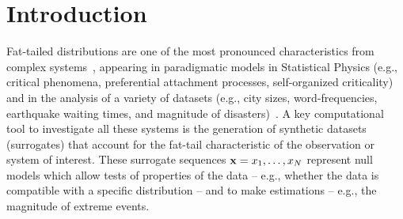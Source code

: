 \documentclass[%
prx,
reprint,
superscriptaddress,
nofootinbib,
 amsmath,amssymb,
 aps,
floatfix,
]{revtex4-2}
\begin{document}
\maketitle


\section{Introduction}

Fat-tailed distributions are one of the most pronounced characteristics from complex systems~\cite{newman2005power,mitzenmacher2004brief,zipf1936psycho}, appearing in paradigmatic models in Statistical Physics (e.g., critical phenomena, preferential attachment processes, self-organized criticality)~\cite{sethna2021statistical,wilson1974renormalization,willis1922some,price1965networks,price1976general,olami1992self,barabasi1999emergence,bak1987self} and in the analysis of a variety of datasets (e.g., city sizes, word-frequencies, earthquake waiting times, and magnitude of disasters)~\cite{simon1955class,zipf1949human,gutenberg1944frequency,bak2002unified}. A key computational tool to investigate all these systems is the generation of synthetic datasets (surrogates) that account for the fat-tail characteristic of the observation or system of interest. 
These surrogate sequences ${\bf x} = x_1, \ldots , x_N$ represent null models which allow tests of properties of the data -- e.g., whether the data is compatible with a specific distribution --  and to make estimations -- e.g., the magnitude of extreme events.
\end{document}
